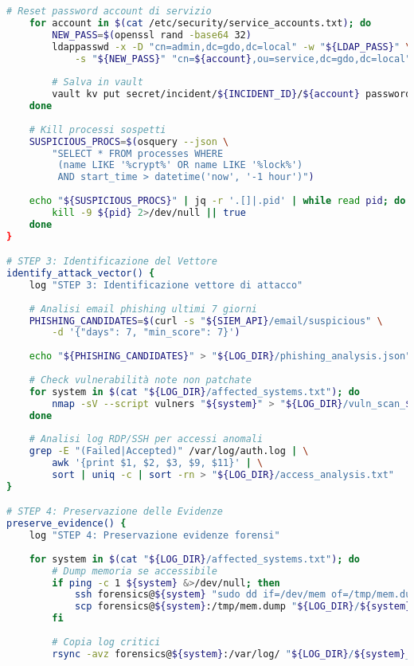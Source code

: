 \begin{lstlisting}[language=bash, caption=Runbook automatizzato per contenimento ransomware]
    # Reset password account di servizio
    for account in $(cat /etc/security/service_accounts.txt); do
        NEW_PASS=$(openssl rand -base64 32)
        ldappasswd -x -D "cn=admin,dc=gdo,dc=local" -w "${LDAP_PASS}" \
            -s "${NEW_PASS}" "cn=${account},ou=service,dc=gdo,dc=local"
        
        # Salva in vault
        vault kv put secret/incident/${INCIDENT_ID}/${account} password="${NEW_PASS}"
    done
    
    # Kill processi sospetti
    SUSPICIOUS_PROCS=$(osquery --json \
        "SELECT * FROM processes WHERE 
         (name LIKE '%crypt%' OR name LIKE '%lock%') 
         AND start_time > datetime('now', '-1 hour')")
    
    echo "${SUSPICIOUS_PROCS}" | jq -r '.[]|.pid' | while read pid; do
        kill -9 ${pid} 2>/dev/null || true
    done
}

# STEP 3: Identificazione del Vettore
identify_attack_vector() {
    log "STEP 3: Identificazione vettore di attacco"
    
    # Analisi email phishing ultimi 7 giorni
    PHISHING_CANDIDATES=$(curl -s "${SIEM_API}/email/suspicious" \
        -d '{"days": 7, "min_score": 7}')
    
    echo "${PHISHING_CANDIDATES}" > "${LOG_DIR}/phishing_analysis.json"
    
    # Check vulnerabilità note non patchate
    for system in $(cat "${LOG_DIR}/affected_systems.txt"); do
        nmap -sV --script vulners "${system}" > "${LOG_DIR}/vuln_scan_${system}.txt"
    done
    
    # Analisi log RDP/SSH per accessi anomali
    grep -E "(Failed|Accepted)" /var/log/auth.log | \
        awk '{print $1, $2, $3, $9, $11}' | \
        sort | uniq -c | sort -rn > "${LOG_DIR}/access_analysis.txt"
}

# STEP 4: Preservazione delle Evidenze
preserve_evidence() {
    log "STEP 4: Preservazione evidenze forensi"
    
    for system in $(cat "${LOG_DIR}/affected_systems.txt"); do
        # Dump memoria se accessibile
        if ping -c 1 ${system} &>/dev/null; then
            ssh forensics@${system} "sudo dd if=/dev/mem of=/tmp/mem.dump"
            scp forensics@${system}:/tmp/mem.dump "${LOG_DIR}/${system}_memory.dump"
        fi
        
        # Copia log critici
        rsync -avz forensics@${system}:/var/log/ "${LOG_DIR}/${system}_logs/"
        

\end{lstlisting}
